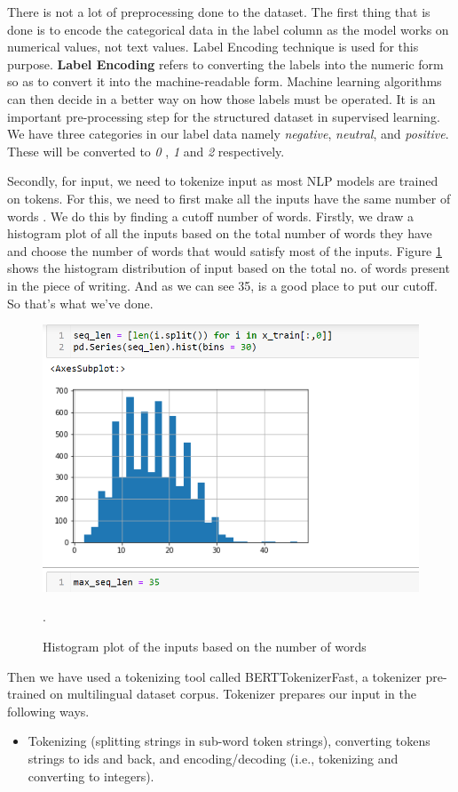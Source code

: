 \documentclass[a4paper, 12pt]{article}
\begin{document}
\begin{sloppypar}
 There is not a lot of preprocessing done to the dataset. The first thing that is done is to encode the categorical data in the label column as the model works on numerical values, not text values. Label Encoding technique is used for this purpose. \textbf{Label Encoding} refers to converting the labels into the numeric form so as to convert it into the machine-readable form. Machine learning algorithms can then decide in a better way on how those labels must be operated. It is an important pre-processing step for the structured dataset in supervised learning.\cite{noauthor_ml_2018}
 We have three categories in our label data namely \textit{negative}, \textit{neutral}, and \textit{positive}. These will be converted to \textit{0} , \textit{1} and \textit{2} respectively.
 
 Secondly, for input, we need to tokenize input as most NLP models are trained on tokens. For this, we need to first make all the inputs have the same number of words . We do this by finding a cutoff number of words. Firstly, we draw a histogram plot of all the inputs based on the total number of words they have and choose the number of words that would satisfy most of the inputs. Figure \ref{plot} shows the histogram distribution of input based on the total no. of words present in the piece of writing. And as we can see 35, is a good place to put our cutoff. So that's what we've done. 
 
 \begin{figure}[H]
 \begin{center}
 \includegraphics[scale=0.65]{maxlen.png}
 \caption{Histogram plot of the inputs based on the number of words\label{plot}}.
 \end{center}
 \end{figure}
 Then we have used a tokenizing tool called BERTTokenizerFast, a tokenizer pre-trained on multilingual dataset corpus. Tokenizer prepares our input in the following ways.
 \begin{itemize}
 \item{Tokenizing (splitting strings in sub-word token strings), converting tokens strings to ids and back, and encoding/decoding (i.e., tokenizing and converting to integers).}\cite{noauthor_tokenizer_nodate}


\end{itemize}
\end{sloppypar}
\end{document}
